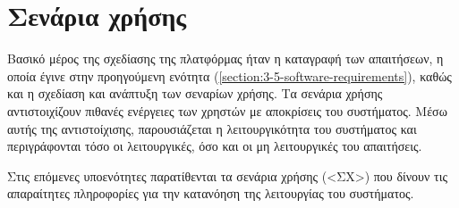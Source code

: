 \section{Σενάρια χρήσης} \label{section:3-6-use-cases}

Βασικό μέρος της σχεδίασης της πλατφόρμας ήταν η καταγραφή των απαιτήσεων, η οποία έγινε στην προηγούμενη ενότητα (\ref{section:3-5-software-requirements}), καθώς και η σχεδίαση και ανάπτυξη των σεναρίων χρήσης. Τα σενάρια χρήσης αντιστοιχίζουν πιθανές ενέργειες των χρηστών με αποκρίσεις του συστήματος. Μέσω αυτής της αντιστοίχισης, παρουσιάζεται η λειτουργικότητα του συστήματος και περιγράφονται τόσο οι λειτουργικές, όσο και οι μη λειτουργικές του απαιτήσεις.

Στις επόμενες υποενότητες παρατίθενται τα σενάρια χρήσης (<ΣΧ>) που δίνουν τις απαραίτητες πληροφορίες για την κατανόηση της λειτουργίας του συστήματος.











